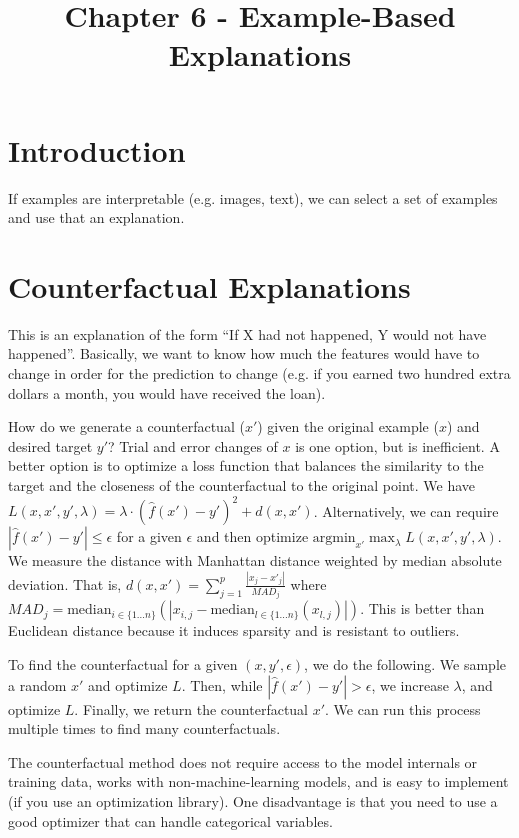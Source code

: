 \documentclass[a4paper]{article}
\title{Chapter 6 - Example-Based Explanations}
\date{}
\begin{document}
\maketitle

\section{Introduction}
If examples are interpretable (e.g. images, text), we can select a set of
examples and use that an explanation.

\section{Counterfactual Explanations}
This is an explanation of the form ``If X had not happened, Y would not have
happened''. Basically, we want to know how much the features would have to change
in order for the prediction to change (e.g. if you earned two hundred extra
dollars a month, you would have received the loan).

How do we generate a counterfactual ($x'$) given the original example ($x$) and
desired target $y'$? Trial
and error changes of $x$ is one option, but is inefficient. A better option is
to optimize a loss function that balances the similarity to the target and
the closeness of the counterfactual to the original point. We have
$L(x, x', y', \lambda) = \lambda \cdot (\hat{f}(x') - y')^2 + d(x, x')$. Alternatively, we can require $|\hat{f}(x') - y'| \leq \epsilon$ for a given
$\epsilon$ and then optimize $\textrm{argmin}_{x'}{\max_{\lambda}{L(x, x', y',
\lambda)}}$. We measure the distance
with Manhattan distance weighted by median absolute deviation. That is,
$d(x, x') = \sum_{j=1}^{p}{\frac{|x_j - x'_j|}{MAD_j}}$ where $MAD_j =
\textrm{median}_{i \in \{1...n\}}(|x_{i, j} - \textrm{median}_{l \in
\{1...n\}}(x_{l,j})|)$. This is better than Euclidean distance because it
induces sparsity and is resistant to outliers.

To find the counterfactual for a given $(x, y', \epsilon)$, we do the
following. We sample a random $x'$ and optimize $L$. Then, while $|\hat{f}(x')
- y'| > \epsilon$, we increase $\lambda$, and optimize $L$. Finally, we return
the counterfactual $x'$. We can run this process multiple times to find many
counterfactuals.

The counterfactual method does not require access to the model internals or
training data, works with non-machine-learning models, and is easy to implement
(if you use an optimization library). One disadvantage is that you need to use
a good optimizer that can handle categorical variables.
\end{document}
